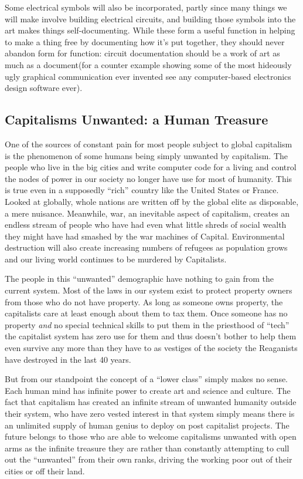 Some electrical symbols will also be incorporated, partly since many
things we will make involve building electrical circuits, and building
those symbols into the art makes things self-documenting. While these
form a useful function in helping to make a thing free by documenting
how it's put together, they should never abandon form for function:
circuit documentation should be a work of art as much as a document(for
a counter example showing some of the most hideously ugly graphical
communication ever invented see any computer-based electronics design
software ever).

\subsection{Capitalisms Unwanted: a Human
Treasure}\label{capitalisms-unwanted-a-human-treasure}

One of the sources of constant pain for most people subject to global
capitalism is the phenomenon of some humans being simply unwanted by
capitalism. The people who live in the big cities and write computer
code for a living and control the nodes of power in our society no
longer have use for most of humanity. This is true even in a supposedly
``rich'' country like the United States or France. Looked at globally,
whole nations are written off by the global elite as disposable, a mere
nuisance. Meanwhile, war, an inevitable aspect of capitalism, creates an
endless stream of people who have had even what little shreds of social
wealth they might have had smashed by the war machines of Capital.
Environmental destruction will also create increasing numbers of
refugees as population grows and our living world continues to be
murdered by Capitalists.

The people in this ``unwanted'' demographic have nothing to gain from
the current system. Most of the laws in our system exist to protect
property owners from those who do not have property. As long as someone
owns property, the capitalists care at least enough about them to tax
them. Once someone has no property \emph{and} no special technical
skills to put them in the priesthood of ``tech'' the capitalist system
has zero use for them and thus doesn't bother to help them even survive
any more than they have to as vestiges of the society the Reaganists
have destroyed in the last 40 years.

But from our standpoint the concept of a ``lower class'' simply makes no
sense. Each human mind has infinite power to create art and science and
culture. The fact that capitalism has created an infinite stream of
unwanted humanity outside their system, who have zero vested interest in
that system simply means there is an unlimited supply of human genius to
deploy on post capitalist projects. The future belongs to those who are
able to welcome capitalisms unwanted with open arms as the infinite
treasure they are rather than constantly attempting to cull out the
``unwanted'' from their own ranks, driving the working poor out of their
cities or off their land.

